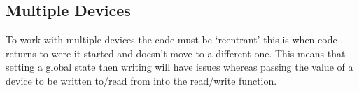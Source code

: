 \subsection{Multiple Devices}
To work with multiple devices the code must be `reentrant' this is when code returns to were it
started and doesn't move to a different one. This means that setting a global state then writing
will have issues whereas passing the value of a device to be written to/read from into the
read/write function.

